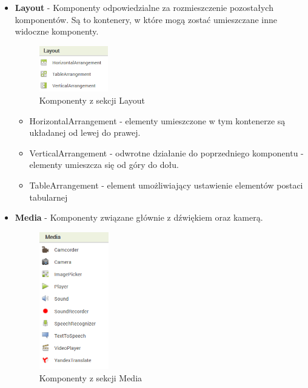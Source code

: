 \begin{itemize}
\item \textbf{Layout} - Komponenty odpowiedzialne za rozmieszczenie pozostałych komponentów. Są to kontenery, w które mogą zostać umieszczane inne widoczne komponenty.
\begin{figure}[H] 
\centering\includegraphics[height=2cm]{figures/components/layout}
\caption{Komponenty z sekcji Layout}
\end{figure}

\begin{itemize}
\item HorizontalArrangement - elementy umieszczone w tym kontenerze są układanej od lewej do prawej.
\item VerticalArrangement - odwrotne działanie do poprzedniego komponentu - elementy umieszcza się od góry do dołu.
\item TableArrangement - element umożliwiający ustawienie elementów postaci tabularnej
\end{itemize}


\item \textbf{Media} - Komponenty związane głównie z dźwiękiem oraz kamerą.
\begin{figure}[H] 
\centering\includegraphics[height=6cm]{figures/components/media}
\caption{Komponenty z sekcji Media}
\end{figure}


\end{itemize}
